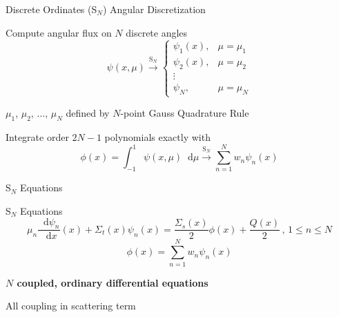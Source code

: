 \documentclass[10pt]{beamer}
\newcommand{\SN}{S$_N$\xspace}
\newcommand{\ud}{\mathop{}\!\mathrm{d}} %
\newcommand{\dderiv}[2]{\frac{\ud #1}{\ud #2}}
\begin{document}
\begin{frame}{Discrete Ordinates (\SN) Angular Discretization}

    Compute angular flux on $N$ discrete angles
    \begin{equation*}
        \psi(x,\mu) \xrightarrow{\text{S}_N} 
        \begin{cases}
            \psi_1(x), & \mu = \mu_1 \\ 
            \psi_2(x), & \mu = \mu_2 \\ 
            \vdots \\ 
            \psi_N, & \mu = \mu_N 
        \end{cases}
    \end{equation*}

    \pause
    $\mu_1$, $\mu_2$, $\dots$, $\mu_N$ defined by $N$-point Gauss Quadrature Rule 

    \pause
    Integrate order $2N-1$ polynomials exactly with 
    \begin{equation*}
        \phi(x) = \int_{-1}^1 \psi(x, \mu) \ud\mu 
            \xrightarrow{\text{S}_N} \sum_{n=1}^N 
            w_n \psi_n(x)
    \end{equation*}

\end{frame}

\begin{frame}{\SN Equations}

	\begin{block}{\SN Equations}
    \begin{equation*}
        \mu_n \dderiv{\psi_n}{x}(x) + \Sigma_t(x) \psi_n(x) = 
        \frac{\Sigma_s(x)}{2} \phi(x) + \frac{Q(x)}{2} \,, \, 1 \leq n \leq N
    \end{equation*}
    \begin{equation*}
        \phi(x) = \sum_{n=1}^N w_n \psi_n(x)
    \end{equation*}
   	\end{block}

    \textbf{$N$ coupled, ordinary differential equations}

    All coupling in scattering term 

\end{frame}
\end{document}
